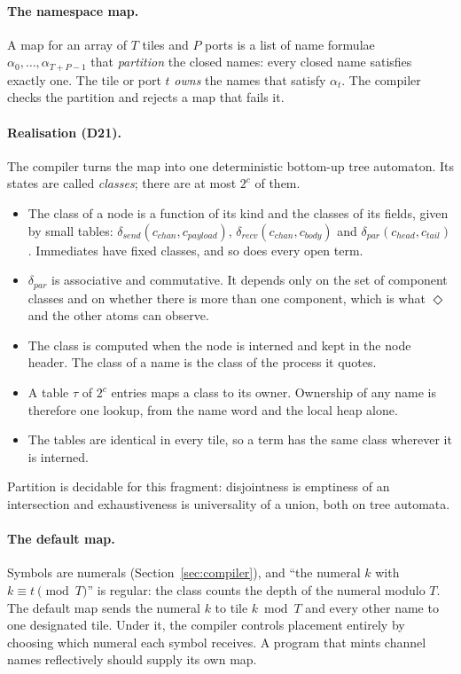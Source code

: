 \documentclass[11pt]{article}
\newcommand{\dec}[1]{\textbf{D#1}}
\theoremstyle{definition}
\theoremstyle{remark}
\begin{document}
\paragraph{The namespace map.} A map for an array of $T$ tiles and $P$ ports
is a list of name formulae $\alpha_0, \dots, \alpha_{T+P-1}$ that
\emph{partition} the closed names: every closed name satisfies exactly one.
The tile or port $t$ \emph{owns} the names that satisfy $\alpha_t$. The
compiler checks the partition and rejects a map that fails it.

\paragraph{Realisation (\dec{21}).} The compiler turns the map into one
deterministic bottom-up tree automaton. Its states are called
\emph{classes}; there are at most $2^c$ of them.
\begin{itemize}
\item The class of a node is a function of its kind and the classes of its
fields, given by small tables: $\delta_{\mathit{send}}(c_{\mathit{chan}},
c_{\mathit{payload}})$, $\delta_{\mathit{recv}}(c_{\mathit{chan}},
c_{\mathit{body}})$ and $\delta_{\mathit{par}}(c_{\mathit{head}},
c_{\mathit{tail}})$. Immediates have fixed classes, and so does every open
term.
\item $\delta_{\mathit{par}}$ is associative and commutative. It depends only
on the set of component classes and on whether there is more than one
component, which is what $\Diamond$ and the other atoms can observe.
\item The class is computed when the node is interned and kept in the node
header. The class of a name is the class of the process it quotes.
\item A table $\tau$ of $2^c$ entries maps a class to its owner. Ownership of
any name is therefore one lookup, from the name word and the local heap
alone.
\item The tables are identical in every tile, so a term has the same class
wherever it is interned.
\end{itemize}
Partition is decidable for this fragment: disjointness is emptiness of an
intersection and exhaustiveness is universality of a union, both on tree
automata.

\paragraph{The default map.} Symbols are numerals (Section~\ref{sec:compiler}),
and ``the numeral $k$ with $k \equiv t \pmod T$'' is regular: the class
counts the depth of the numeral modulo $T$. The default map sends the numeral
$k$ to tile $k \bmod T$ and every other name to one designated tile. Under
it, the compiler controls placement entirely by choosing which numeral each
symbol receives. A program that mints channel names reflectively should
supply its own map.
\end{document}
